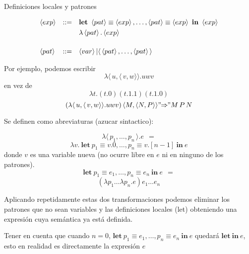 \documentclass[handout]{beamer}
\newcommand{\var}{\left\langle var\right\rangle}
\newcommand{\pat}{\left\langle pat\right\rangle}
\newcommand{\ex}{\left\langle exp\right\rangle}
\begin{document}



\begin{frame}{Definiciones locales y patrones}

\[
\begin{array}{lll}
\ex & ::=& \textbf{let}\ \pat \equiv \ex, \ldots, \pat \equiv \ex\ \textbf{in}\ \ex \smallskip\\
& &  \lambda \pat.\ex \smallskip\\
\\
\pat& ::= &\var | \langle\,\pat,\ldots,\pat\,\rangle
\end{array}
\]
\pause
\bigskip

Por ejemplo,  podemos escribir 
\[\lambda \langle\,u,\langle\,v,w\rangle\rangle.u w v\] 
en vez de 
\[ \lambda t. (t.0) (t.1.1) (t.1.0) \]
\pause
\medskip
\[ (\lambda \langle\,u,\langle\,v,w\rangle\rangle.u w v)\, \langle M ,\langle N , P \rangle \rangle "\!\!\Rightarrow\!\!" M\, P\, N \]
\end{frame}

\begin{frame}

Se definen como abreviaturas (azucar sintactico): 

\[\lambda \langle\,p_1,\ldots,p_n\,\rangle.e\ \ =\] 
\[\lambda v.\ \textbf{let}\ p_1 \equiv v.0, \ldots, p_n \equiv v.[n-1]\ \textbf{in}\ e\]
donde $v$ es una variable nueva (no ocurre libre en $e$ ni en ninguno de los
patrones).
\pause
\medskip
\[ \textbf{let}\ p_1 \equiv e_1, \ldots, p_n \equiv e_n\ \textbf{in}\ e\ \ =\]
\[(\lambda p_1\ldots\lambda p_n.e) e_1 \ldots e_n\]

\end{frame}


\begin{frame}

Aplicando repetidamente estas dos transformaciones podemos eliminar los patrones
que no sean variables y las definiciones locales (let) obteniendo una expresión
cuya semántica ya está definida.
\pause
\bigskip

Tener en cuenta que cuando $n = 0$,
$\textbf{let}\ p_1 \equiv e_1, \ldots, p_n \equiv e_n\ \textbf{in}\ e$ quedará
$\textbf{let}\ \textbf{in}\ e$, esto en realidad es directamente la expresión $e$ 

\end{frame}


\end{document}
